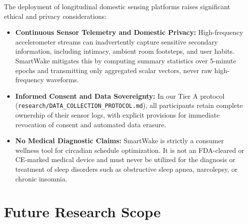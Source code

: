 \documentclass[journal,11pt,onecolumn]{IEEEtran}
\begin{document}
The deployment of longitudinal domestic sensing platforms raises significant ethical and privacy considerations:
\begin{itemize}[leftmargin=*]
    \item \textbf{Continuous Sensor Telemetry and Domestic Privacy:} High-frequency accelerometer streams can inadvertently capture sensitive secondary information, including intimacy, ambient room footsteps, and user habits. SmartWake mitigates this by computing summary statistics over 5-minute epochs and transmitting only aggregated scalar vectors, never raw high-frequency waveforms.
    \item \textbf{Informed Consent and Data Sovereignty:} In our Tier A protocol (\texttt{research/}\allowbreak\texttt{DATA\_}\allowbreak\texttt{COLLECTION\_}\allowbreak\texttt{PROTOCOL.md}), all participants retain complete ownership of their sensor logs, with explicit provisions for immediate revocation of consent and automated data erasure.
    \item \textbf{No Medical Diagnostic Claims:} SmartWake is strictly a consumer wellness tool for circadian schedule optimization. It is not an FDA-cleared or CE-marked medical device and must never be utilized for the diagnosis or treatment of sleep disorders such as obstructive sleep apnea, narcolepsy, or chronic insomnia.
\end{itemize}

\section{Future Research Scope}
\label{sec:future_scope}
\end{document}
